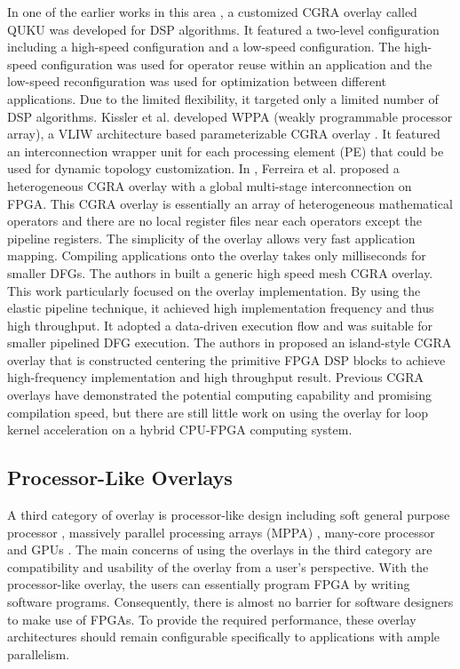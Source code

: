 In one of the earlier works in this area \cite{shukla2006quku}, a customized CGRA overlay called QUKU was developed for DSP algorithms. It featured a two-level configuration including a high-speed configuration and a low-speed configuration. The high-speed configuration was used for operator reuse within an application and the low-speed reconfiguration was used for optimization between different applications. Due to the limited flexibility, it targeted only a limited number of DSP algorithms. Kissler et al. developed WPPA (weakly programmable processor array), a VLIW architecture based parameterizable CGRA overlay \cite{kissler2006dynamically}. It featured an interconnection wrapper unit for each processing element (PE) that could be used for dynamic topology customization. In \cite{ferreira2011fpga}, Ferreira et al. proposed a heterogeneous CGRA overlay with a global multi-stage interconnection on FPGA. This CGRA overlay is essentially an array of heterogeneous mathematical operators and there are no local register files near each operators except the pipeline registers. The simplicity of the overlay allows very fast application mapping. Compiling applications onto the overlay takes only milliseconds for smaller DFGs. The authors in \cite{capalijia2013pipelined} built a generic high speed mesh CGRA overlay. This work particularly focused on the overlay implementation. By using the elastic pipeline technique, it achieved high implementation frequency and thus high throughput. It adopted a data-driven execution flow and was suitable for smaller pipelined DFG execution. The authors in \cite{jain2015efficient} proposed an island-style CGRA overlay that is constructed centering the primitive FPGA DSP blocks to achieve high-frequency implementation and high throughput result. Previous CGRA overlays have demonstrated the potential computing capability and promising compilation speed, but there are still little work on using the overlay for loop kernel acceleration on a hybrid CPU-FPGA computing system. 

\subsection{Processor-Like Overlays}
A third category of overlay is processor-like design including soft general purpose processor \cite{microblaze, nios, cheah2012iDEA, laforest2012OCTAVO, yiannacouras2007exploration}, massively parallel processing arrays (MPPA) \cite{anjam2010vliw, hannig2014invasive, boppu2014compact}, many-core processor \cite{lebedev2010MARC} and GPUs \cite{jeffrey2011potential}. The main concerns of using the overlays in the third category are compatibility and usability of the overlay from a user's perspective. With the processor-like overlay, the users can essentially program FPGA by writing software programs. Consequently, there is almost no barrier for software designers to make use of FPGAs. To provide the required performance, these overlay architectures should remain configurable specifically to applications with ample parallelism.

